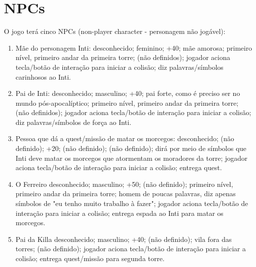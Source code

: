 \documentclass[12pt]{article}
\begin{document}
\section{NPCs}
O jogo terá cinco NPCs (non-player character - personagem não jogável):
\begin{enumerate}
\item Mãe do personagem Inti:
 desconhecido;
 feminino;
 +40;
 mãe amorosa;
 primeiro nível, primeiro andar da
primeira torre;
 (não definidos);
 jogador aciona tecla/botão de interação para iniciar a
colisão;
 diz palavras/símbolos carinhosos ao Inti.

\item Pai de Inti:
 desconhecido;
 masculino;
 +40;
 pai forte, como é preciso ser no mundo
pós-apocalíptico;
 primeiro nível, primeiro andar da
primeira torre;
 (não definidos);
 jogador aciona tecla/botão de interação para iniciar a
colisão;
 diz palavras/símbolos de força ao Inti.

\item Pessoa que dá a quest/missão de matar os morcegos:
 desconhecido;
 (não definido);
 +20;
 (não definido);
 (não definido);
 dirá por meio de símbolos que Inti deve matar os
morcegos que atormentam os moradores da torre;
 jogador aciona tecla/botão de interação para iniciar a
colisão;
 entrega quest.

\item O Ferreiro
 desconhecido;
 masculino;
 +50;
 (não definido);
 primeiro nível, primeiro andar da
primeira torre;
 homem de poucas palavras, diz apenas símbolos de "eu
tenho muito trabalho à fazer";
 jogador aciona tecla/botão de interação para iniciar a
colisão;
 entrega espada ao Inti para matar os morcegos.

\item Pai da Killa
 desconhecido;
 masculino;
 +40;
 (não definido);
 vila fora das torres;
 (não definido);
 jogador aciona tecla/botão de interação para iniciar a
colisão;
 entrega quest/missão para segunda torre.
\end{enumerate}
\end{document}
